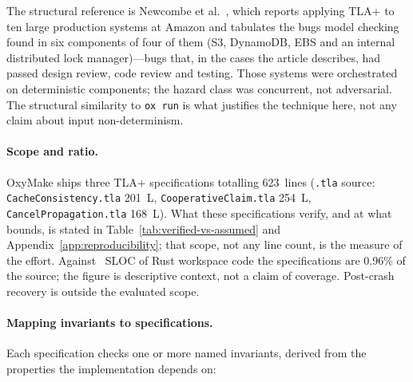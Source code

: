 \documentclass[12pt,a4paper]{article}
\newcommand{\code}[1]{{\texttt{\small\color{inlinecode}#1}}}
\begin{document}
The structural reference is Newcombe et
al.~\cite[pp.~66--73]{newcombeHowAmazonWebServices2015}, which reports
applying TLA+ to ten large production systems at Amazon and tabulates
the bugs model checking found in six components of four of them (S3,
DynamoDB, EBS and an internal distributed lock manager)---bugs that,
in the cases the article describes, had passed design review, code
review and testing. Those systems were orchestrated on deterministic
components; the hazard class was concurrent, not adversarial. The
structural similarity to \code{ox run} is what justifies the
technique here, not any claim about input non-determinism.

\paragraph{Scope and ratio.}
OxyMake ships three TLA+ specifications totalling 623~lines (\code{.tla}
source: \code{Cache\allowbreak Consistency.tla} 201~L, \code{Cooperative\allowbreak Claim.tla}
254~L, \code{Cancel\allowbreak Propagation.tla} 168~L). What these specifications
verify, and at what bounds, is stated in Table~\ref{tab:verified-vs-assumed}
and Appendix~\ref{app:reproducibility}; that scope, not any line count,
is the measure of the effort. Against \metricSLOC~SLOC of Rust workspace
code the specifications are 0.96\% of the source; the figure is
descriptive context, not a claim of coverage. Post-crash
recovery is outside the evaluated scope.

\paragraph{Mapping invariants to specifications.}
Each specification checks one or more named invariants, derived from the
properties the implementation depends on:
\end{document}
